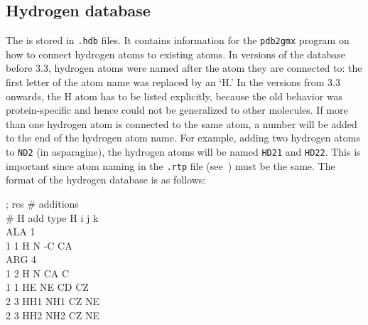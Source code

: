 \subsection{Hydrogen database}
\label{subsec:hdb}
The  is stored in {\tt .hdb} files. It
contains information for the {\tt pdb2gmx} program on how to connect
hydrogen atoms to existing atoms. In versions of the database before
{\gromacs} 3.3, hydrogen atoms were named after the atom they are
connected to: the first letter of the atom name was replaced by an
`H.' In the versions from 3.3 onwards, the H atom has to be listed explicitly,
because the old behavior was protein-specific and hence could not
be generalized to other molecules.
If more than one hydrogen atom is connected to the same atom, a
number will be added to the end of the hydrogen atom name. For
example, adding two hydrogen atoms to {\tt ND2} (in asparagine), the
hydrogen atoms will be named {\tt HD21} and {\tt HD22}. This is
important since atom naming in the {\tt .rtp} file (see~)
must be the same. The format of the hydrogen database is as follows:\\
%
\begin{small}
\begin{tt}
; res   \# additions\\
        \# H add type    H       i       j       k\\
ALA     1\\
        1       1       H       N       -C      CA\\
ARG     4\\
        1       2       H       N       CA      C\\
        1       1       HE      NE      CD      CZ\\
        2       3       HH1     NH1     CZ      NE\\
        2       3       HH2     NH2     CZ      NE\\
\end{tt}
\end{small}

